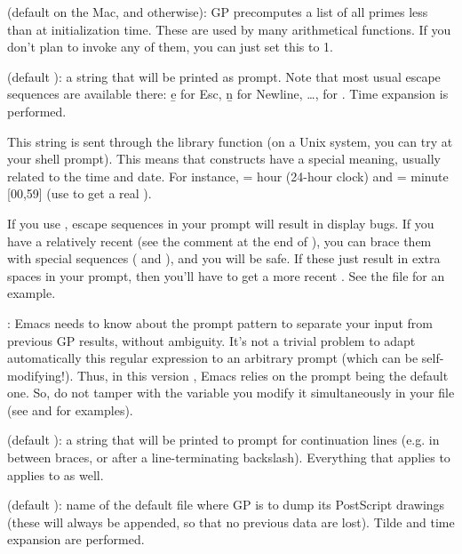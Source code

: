  (default  on the Mac, and 
otherwise): GP precomputes a list of all primes less than 
at initialization time. These are used by many arithmetical functions. If
you don't plan to invoke any of them, you can just set this to 1.

 (default ): a string that will be printed as
prompt. Note that most usual escape sequences are available there: \b{e} for
Esc, \b{n} for Newline, \dots, \kbd{\bs\bs} for \kbd{\bs}. Time expansion is
performed.

This string is sent through the library function  (on a
Unix system, you can try  at your shell prompt). This means
that \kbd{\%} constructs have a special meaning, usually related to the time
and date. For instance,  = hour (24-hour clock) and  =
minute [00,59] (use \kbd{\%\%} to get a real \kbd{\%}).

If you use , escape sequences in your prompt will result in
display bugs. If you have a relatively recent  (see the comment
at the end of ), you can brace them with special sequences
(\kbd{\bs[} and \kbd{\bs]}), and you will be safe. If these just result in
extra spaces in your prompt, then you'll have to get a more recent
. See the file  for an example.

: Emacs needs to know about the prompt pattern to
separate your input from previous GP results, without ambiguity. It's not a
trivial problem to adapt automatically this regular expression to an
arbitrary prompt (which can be self-modifying!). Thus, in this version \vers,
Emacs relies on the prompt being the default one. So, do not tamper with the
 variable  you modify it simultaneously in your
 file (see  and  for
examples).

 (default ): a string that will be printed
to prompt for continuation lines (e.g. in between braces, or after a
line-terminating backslash). Everything that applies to 
applies to  as well.

 (default ): name of the default file where
GP is to dump its PostScript drawings (these will always be appended, so that
no previous data are lost). Tilde and time expansion are performed.

